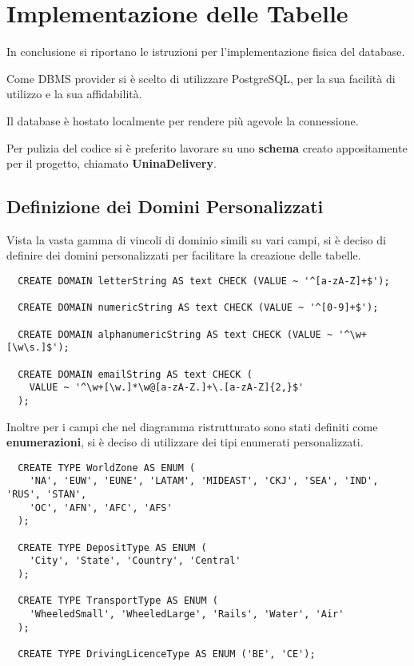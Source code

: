 \chapter{Implementazione delle Tabelle}

In conclusione si riportano le istruzioni per l'implementazione fisica del database.

Come DBMS provider si è scelto di utilizzare PostgreSQL, per la sua facilità di utilizzo e la sua affidabilità.

Il database è hostato localmente per rendere più agevole la connessione.

Per pulizia del codice si è preferito lavorare su uno \textbf{schema} creato appositamente per il progetto, chiamato \textbf{UninaDelivery}.

\section{Definizione dei Domini Personalizzati}

Vista la vasta gamma di vincoli di dominio simili su vari campi, si è deciso di definire dei domini personalizzati per facilitare la creazione delle tabelle.

\begin{lstlisting}
  CREATE DOMAIN letterString AS text CHECK (VALUE ~ '^[a-zA-Z]+$');
  
  CREATE DOMAIN numericString AS text CHECK (VALUE ~ '^[0-9]+$');
  
  CREATE DOMAIN alphanumericString AS text CHECK (VALUE ~ '^\w+[\w\s.]$');
  
  CREATE DOMAIN emailString AS text CHECK (
    VALUE ~ '^\w+[\w.]*\w@[a-zA-Z.]+\.[a-zA-Z]{2,}$'
  );
\end{lstlisting}

Inoltre per i campi che nel diagramma ristrutturato sono stati definiti come \textbf{enumerazioni}, si è deciso di utilizzare dei tipi enumerati personalizzati.
\begin{lstlisting}
  CREATE TYPE WorldZone AS ENUM (
    'NA', 'EUW', 'EUNE', 'LATAM', 'MIDEAST', 'CKJ', 'SEA', 'IND', 'RUS', 'STAN', 
    'OC', 'AFN', 'AFC', 'AFS'
  );

  CREATE TYPE DepositType AS ENUM (
    'City', 'State', 'Country', 'Central'
  );

  CREATE TYPE TransportType AS ENUM (
    'WheeledSmall', 'WheeledLarge', 'Rails', 'Water', 'Air'
  );
  
  CREATE TYPE DrivingLicenceType AS ENUM ('BE', 'CE');
\end{lstlisting}

